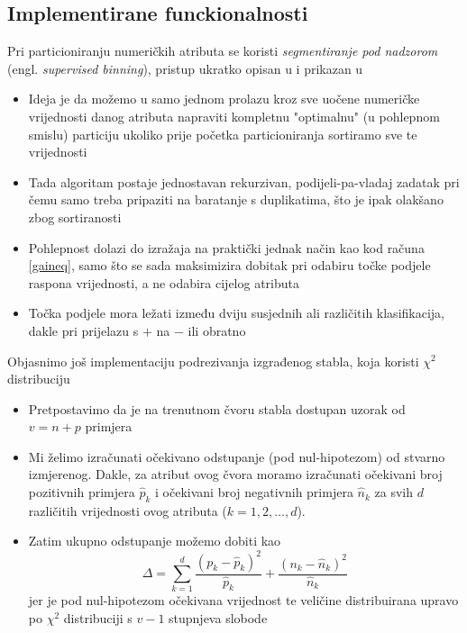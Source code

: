 \documentclass{beamer}
\begin{document}
\subsection{Implementirane funckionalnosti}
\begin{frame}
Pri particioniranju numeričkih atributa se koristi \emph{segmentiranje pod nadzorom} (engl. \textit{supervised binning}),
pristup ukratko opisan u \cite{rn} i prikazan
u \cite{gaineq}
\begin{itemize}
    \item Ideja je da možemo u samo jednom prolazu kroz sve uočene numeričke vrijednosti danog atributa
 napraviti kompletnu "optimalnu" (u pohlepnom smislu) particiju ukoliko prije početka particioniranja sortiramo sve te vrijednosti
 \item Tada algoritam postaje jednostavan rekurzivan, podijeli-pa-vladaj zadatak pri čemu samo treba pripaziti na baratanje s duplikatima,
 što je ipak olakšano zbog sortiranosti
 \item Pohlepnost dolazi do izražaja na praktički jednak način kao kod računa \eqref{gaineq},
 samo što se sada maksimizira dobitak pri odabiru točke podjele raspona vrijednosti, a ne odabira cijelog atributa
 \item Točka podjele mora
 ležati između dviju susjednih ali različitih klasifikacija, dakle pri prijelazu s $+$ na $-$ ili obratno
\end{itemize}
\end{frame}

\begin{frame}
Objasnimo još implementaciju podrezivanja izgrađenog stabla, koja koristi $\chi^2$ distribuciju
\begin{itemize}
    \item Pretpostavimo da je na trenutnom čvoru stabla dostupan uzorak od $v=n+p$ primjera
    \item Mi želimo izračunati očekivano odstupanje (pod nul-hipotezom) od stvarno izmjerenog. 
    Dakle, za atribut ovog čvora moramo izračunati očekivani broj pozitivnih primjera $\hat{p}_k$
 i očekivani broj negativnih primjera $\hat{n}_k$ za svih $d$ različitih vrijednosti ovog atributa ($k=1,2,\ldots,d$).
 \item Zatim ukupno odstupanje možemo dobiti kao
 \begin{equation*}
    \Delta=\sum^d_{k=1}\frac{(p_k-\hat{p}_k)^2}{\hat{p}_k}+\frac{(n_k-\hat{n}_k)^2}{\hat{n}_k}
 \end{equation*}
jer je pod nul-hipotezom očekivana vrijednost te veličine distribuirana upravo po $\chi^2$ distribuciji s $v-1$ stupnjeva slobode
\end{itemize}
\end{frame}
\end{document}

